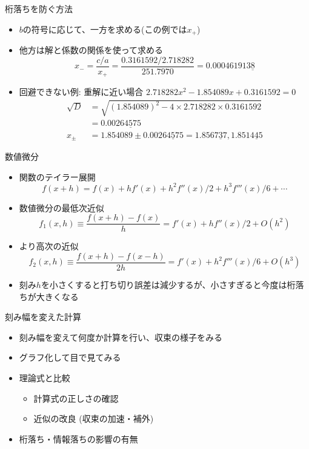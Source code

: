 \documentclass[dvipdfmx]{beamer}
\begin{document}
\begin{frame}[t,fragile]{桁落ちを防ぐ方法}
  \begin{itemize}
    \setlength{\itemsep}{1em}
  \item $b$の符号に応じて、一方を求める(この例では$x_+$)
  \item 他方は解と係数の関係を使って求める
    \[
    x_- = \frac{c/a}{x_+} = \frac{0.3161592 / 2.718282}{251.7970} = 0.000461913\underline{8}
    \]
  \item 回避できない例: 重解に近い場合 $2.718282x^2 - 1.854089x + 0.3161592=0$
    \begin{align*}
      \sqrt{D} &= \sqrt{(1.854089)^2 - 4 \times 2.718282 \times 0.3161592} \\ &= 0.002\underline{64575} \\
      x_\pm &= 1.854089 \pm 0.002\underline{64575} = 1.856\underline{737}, 1.851\underline{445}
    \end{align*}
  \end{itemize}
\end{frame}

\begin{frame}[t,fragile]{数値微分}
  \begin{itemize}
    \setlength{\itemsep}{1em}
  \item 関数のテイラー展開
    \[
    f(x+h) = f(x) + h f'(x) + h^2 f''(x)/2 + h^3 f'''(x)/6 + \cdots
    \]
  \item 数値微分の最低次近似
    \[
    f_1(x,h) \equiv \frac{f(x+h)-f(x)}{h} = f'(x) + h f''(x)/2 + O(h^2)
    \]
  \item より高次の近似
    \[
    f_2(x,h) \equiv \frac{f(x+h)-f(x-h)}{2h} = f'(x) + h^2 f'''(x)/6 + O(h^3)
    \]
  \item 刻み$h$を小さくすると打ち切り誤差は減少するが、小さすぎると今度は桁落ちが大きくなる
  \end{itemize}
\end{frame}

\begin{frame}[t,fragile]{刻み幅を変えた計算}
  \begin{itemize}
    \setlength{\itemsep}{1em}
  \item 刻み幅を変えて何度か計算を行い、収束の様子をみる
  \item グラフ化して目で見てみる
  \item 理論式と比較
    \begin{itemize}
    \item 計算式の正しさの確認
    \item 近似の改良 (収束の加速・補外)
    \end{itemize}
  \item 桁落ち・情報落ちの影響の有無
  \end{itemize}
\end{frame}
\end{document}
